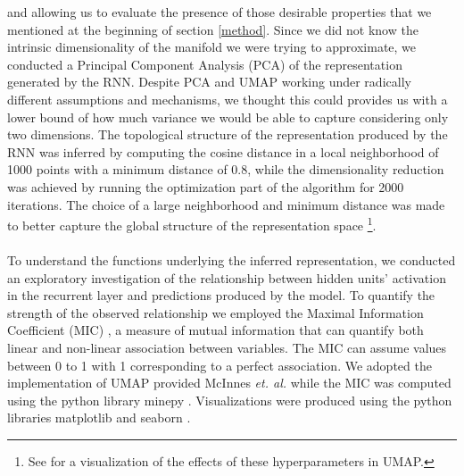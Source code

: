 and allowing us to evaluate the presence of those desirable properties that we mentioned at the beginning of section \ref{method}. Since we did not know the intrinsic dimensionality of the manifold we were trying to approximate, we conducted a Principal Component Analysis (PCA) of the representation generated by the RNN. Despite PCA and UMAP working under radically different assumptions and mechanisms, we thought this could provides us with a lower bound of how much variance we would be able to capture considering only two dimensions. The topological structure of the representation produced by the RNN was inferred by computing the cosine distance in a local neighborhood of 1000 points with a minimum distance of 0.8, while the dimensionality reduction was achieved by running the optimization part of the algorithm for 2000 iterations. The choice of a large neighborhood and minimum distance was made to better capture the global structure of the representation space \footnote{See \cite{umapwebs} for a visualization of the effects of these hyperparameters in UMAP.}.\\
\\
To understand the functions underlying the inferred representation, we conducted an exploratory investigation of the relationship between hidden units' activation in the recurrent layer and predictions produced by the model. To quantify the strength of the observed relationship we employed the Maximal Information Coefficient (MIC) \cite{reshef2011detecting}, a measure of mutual information that can quantify both linear and non-linear association between variables. The MIC can assume values between 0 to 1 with 1 corresponding to a perfect association. We adopted the implementation of UMAP provided McInnes \textit{et. al.} \cite{mcinnes2018umap-software} while the MIC was computed using the python library minepy \cite{albanese2013minerva}. Visualizations were produced using the python libraries matplotlib \cite{hunter2007matplotlib} and seaborn \cite{waskom2021seaborn}.

